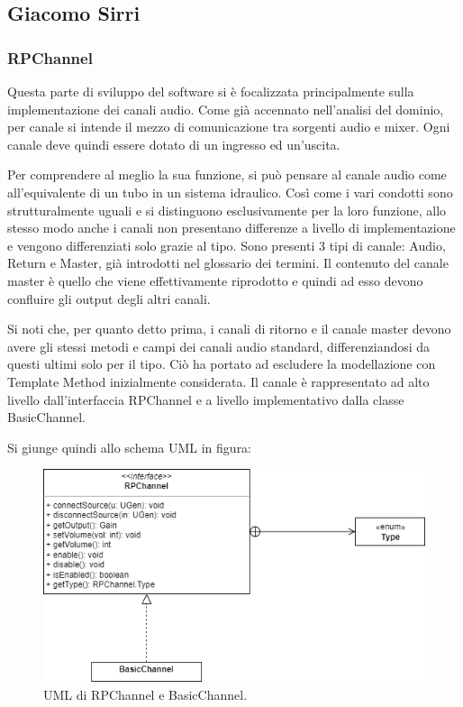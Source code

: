 \documentclass[a4paper,12pt]{report}
\begin{document}
\subsection{Giacomo Sirri}
\subsubsection{RPChannel}
Questa parte di sviluppo del software si è focalizzata principalmente sulla implementazione dei canali audio. Come già accennato nell’analisi del dominio, per canale si intende il mezzo di comunicazione tra sorgenti audio e mixer. Ogni canale deve quindi essere dotato di un ingresso ed un’uscita. 

Per comprendere al meglio la sua funzione, si può pensare al canale audio come all’equivalente di un tubo in un sistema idraulico. Così come i vari condotti sono strutturalmente uguali e si distinguono esclusivamente per la loro funzione, allo stesso modo anche i canali non presentano differenze a livello di implementazione e vengono differenziati solo grazie al tipo. Sono presenti 3 tipi di canale: Audio, Return e Master, già introdotti nel glossario dei termini.
Il contenuto del canale master è quello che viene effettivamente riprodotto e quindi ad esso devono confluire gli output degli altri canali. 

Si noti che, per quanto detto prima, i canali di ritorno e il canale master devono avere gli stessi metodi e campi dei canali audio standard, differenziandosi da questi ultimi solo per il tipo. Ciò ha portato ad escludere la modellazione con Template Method inizialmente considerata. Il canale è rappresentato ad alto livello dall’interfaccia RPChannel e a livello implementativo dalla classe BasicChannel. 

Si giunge quindi allo schema UML in figura:

\begin{figure}[H]
\centering{}
\includegraphics[scale=0.6]{img/channel.png}
\caption{UML di RPChannel e BasicChannel.}
\end{figure}
\end{document}
